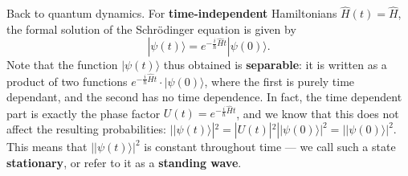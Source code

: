 \documentclass[fleqn]{article}
\begin{document}
Back to quantum dynamics.
For \textbf{time-independent} Hamiltonians \(\hat{H}(t)=\hat{H}\), the formal solution of the Schrödinger equation is given by
\[
  |\psi(t)\rangle
  = e^{-\frac{i}{\hbar}\hat{H}t}|\psi(0)\rangle.
\]
Note that the function \(|\psi(t)\rangle\) thus obtained is \textbf{separable}: it is written as a product of two functions \(e^{-\frac{i}{\hbar}\hat{H}t}\cdot|\psi(0)\rangle\), where the first is purely time dependant, and the second has no time dependence.
In fact, the time dependent part is exactly the phase factor \(U(t)=e^{-\frac{i}{\hbar}\hat{H}t}\), and we know that this does not affect the resulting probabilities: \(||\psi(t)\rangle|^2=|U(t)|^2||\psi(0)\rangle|^2=||\psi(0)\rangle|^2\).
This means that \(||\psi(t)\rangle|^2\) is constant throughout time --- we call such a state \textbf{stationary}, or refer to it as a \textbf{standing wave}.
\end{document}

